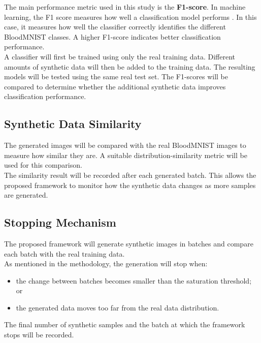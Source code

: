\documentclass[12pt,a4paper]{report}
\begin{document}
\begin{justify}
The main performance metric used in this study is the \textbf{F1-score}. In machine learning, the F1 score measures how well a classification model performs \parencite{geeksforgeeks_f1}. In this case, it measures how well the classifier correctly identifies the different BloodMNIST classes. A higher F1-score indicates better classification performance. \\

\noindent A classifier will first be trained using only the real training data. Different amounts of synthetic data will then be added to the training data. The resulting models will be tested using the same real test set. The F1-scores will be compared to determine whether the additional synthetic data improves classification performance.

\subsection{Synthetic Data Similarity}

The generated images will be compared with the real BloodMNIST images to measure how similar they are. A suitable distribution-similarity metric will be used for this comparison. \\

\noindent The similarity result will be recorded after each generated batch. This allows the proposed framework to monitor how the synthetic data changes as more samples are generated.

\subsection{Stopping Mechanism}

The proposed framework will generate synthetic images in batches and compare each batch with the real training data. \\

\noindent As mentioned in the methodology, the generation will stop when:

\begin{itemize}
\item the change between batches becomes smaller than the saturation threshold; or
\item the generated data moves too far from the real data distribution.
\end{itemize}

\noindent The final number of synthetic samples and the batch at which the framework stops will be recorded.


\end{justify}
\end{document}
